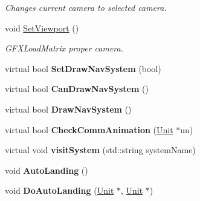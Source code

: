 \begin{DoxyCompactItemize}
\begin{DoxyCompactList}\small\item\em Changes current camera to selected camera. \end{DoxyCompactList}\item 
void \hyperlink{classGameCockpit_a6325d965c6ba6279596f2e6b5742b8c5}{Set\+Viewport} ()\hypertarget{classGameCockpit_a6325d965c6ba6279596f2e6b5742b8c5}{}\label{classGameCockpit_a6325d965c6ba6279596f2e6b5742b8c5}

\begin{DoxyCompactList}\small\item\em G\+F\+X\+Load\+Matrix proper camera. \end{DoxyCompactList}\item 
virtual bool {\bfseries Set\+Draw\+Nav\+System} (bool)\hypertarget{classGameCockpit_acc21b525244f307b6c991a79aeb2e369}{}\label{classGameCockpit_acc21b525244f307b6c991a79aeb2e369}

\item 
virtual bool {\bfseries Can\+Draw\+Nav\+System} ()\hypertarget{classGameCockpit_a3d4bd043a23dfaf3e97e40a2d35d6523}{}\label{classGameCockpit_a3d4bd043a23dfaf3e97e40a2d35d6523}

\item 
virtual bool {\bfseries Draw\+Nav\+System} ()\hypertarget{classGameCockpit_a89ca60f12c339c54abc4c6c456aff5de}{}\label{classGameCockpit_a89ca60f12c339c54abc4c6c456aff5de}

\item 
virtual bool {\bfseries Check\+Comm\+Animation} (\hyperlink{classUnit}{Unit} $\ast$un)\hypertarget{classGameCockpit_a5d21caeeea0be7a0f7c1cc75ce9f2fea}{}\label{classGameCockpit_a5d21caeeea0be7a0f7c1cc75ce9f2fea}

\item 
virtual void {\bfseries visit\+System} (std\+::string system\+Name)\hypertarget{classGameCockpit_a3e3405166f05f2f3475d9b0e4a1cebea}{}\label{classGameCockpit_a3e3405166f05f2f3475d9b0e4a1cebea}

\item 
void {\bfseries Auto\+Landing} ()\hypertarget{classGameCockpit_a9d482100e272fe6edf5cfcf655faa298}{}\label{classGameCockpit_a9d482100e272fe6edf5cfcf655faa298}

\item 
void {\bfseries Do\+Auto\+Landing} (\hyperlink{classUnit}{Unit} $\ast$, \hyperlink{classUnit}{Unit} $\ast$)\hypertarget{classGameCockpit_ad6516aa74c7c686475b1bef498807f6d}{}\label{classGameCockpit_ad6516aa74c7c686475b1bef498807f6d}


\end{DoxyCompactItemize}
